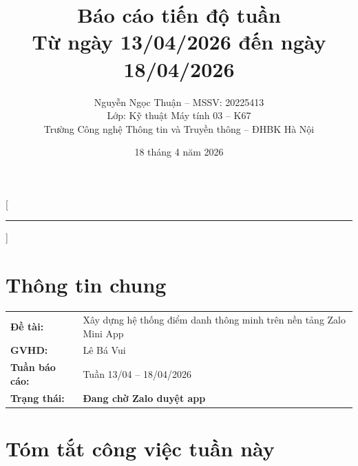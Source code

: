 \documentclass{article}
\title{Báo cáo tiến độ tuần\\[0.3em] \large Từ ngày 13/04/2026 đến ngày 18/04/2026}
\author{Nguyễn Ngọc Thuận -- MSSV: 20225413\\[0.2em] \normalsize Lớp: Kỹ thuật Máy tính 03 -- K67\\[0.1em] \normalsize Trường Công nghệ Thông tin và Truyền thông -- ĐHBK Hà Nội}
\date{18 tháng 4 năm 2026}
\begin{document}
\maketitle



\pagestyle{fancy}
\fancyhf{}
\fancyfoot[C]{\small\thepage}
\renewcommand{\headrulewidth}{0.4pt}

[\vspace{-0.3em}\textcolor{hustred}{\rule{\textwidth}{0.8pt}}]

\section{Thông tin chung}

\begin{tabularx}{\textwidth}{@{}l X@{}}
\textbf{Đề tài:} & Xây dựng hệ thống điểm danh thông minh trên nền tảng Zalo Mini App \\
\textbf{GVHD:} & Lê Bá Vui \\
\textbf{Tuần báo cáo:} & Tuần 13/04 -- 18/04/2026 \\
\textbf{Trạng thái:} & \textcolor{statusamber}{\textbf{Đang chờ Zalo duyệt app}} \\
\end{tabularx}

\section{Tóm tắt công việc tuần này}
\end{document}
